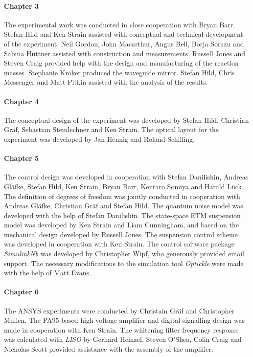 \paragraph{Chapter 3}
The experimental work was conducted in close cooperation with Bryan Barr. Stefan Hild and Ken Strain assisted with conceptual and technical development of the experiment. Neil Gordon, John Macarthur, Angus Bell, Borja Sorazu and Sabina Huttner assisted with construction and measurements. Russell Jones and Steven Craig provided help with the design and manufacturing of the reaction masses. Stephanie Kroker produced the waveguide mirror. Stefan Hild, Chris Messenger and Matt Pitkin assisted with the analysis of the results.

\paragraph{Chapter 4}
The conceptual design of the experiment was developed by Stefan Hild, Christian Gr\"{a}f, Sebastian Steinlechner and Ken Strain. The optical layout for the experiment was developed by Jan Hennig and Roland Schilling.

\paragraph{Chapter 5}
The control design was developed in cooperation with Stefan Danilishin, Andreas Gl\"{a}fke, Stefan Hild, Ken Strain, Bryan Barr, Kentaro Somiya and Harald L\"{u}ck. The definition of degrees of freedom was jointly conducted in cooperation with Andreas Gl\"{a}fke, Christian Gr\"{a}f and Stefan Hild. The quantum noise model was developed with the help of Stefan Danilishin. The state-space ETM suspension model was developed by Ken Strain and Liam Cunningham, and based on the mechanical design developed by Russell Jones. The suspension control scheme was developed in cooperation with Ken Strain. The control software package \emph{SimulinkNb} was developed by Christopher Wipf, who generously provided email support. The necessary modifications to the simulation tool \emph{Optickle} were made with the help of Matt Evans.

\paragraph{Chapter 6}
The ANSYS experiments were conducted by Christain Gr\"{a}f and Christopher Mullen. The PA95-based high voltage amplifier and digital signalling design was made in cooperation with Ken Strain. The whitening filter frequency response was calculated with \emph{LISO} by Gerhard Heinzel. Steven O'Shea, Colin Craig and Nicholas Scott provided assistance with the assembly of the amplifier.

